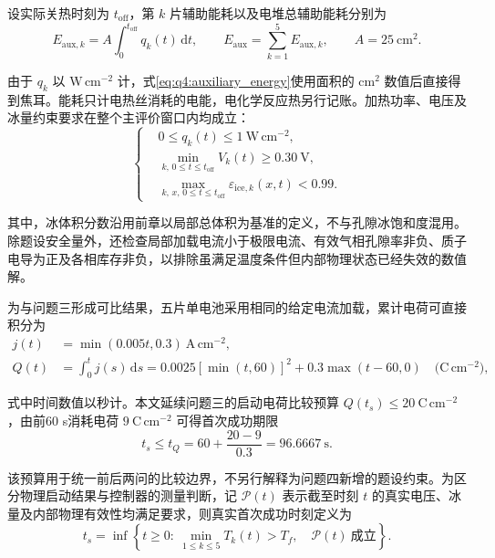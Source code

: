 设实际关热时刻为 $t_{\mathrm{off}}$，第 $k$ 片辅助能耗以及电堆总辅助能耗分别为
\begin{equation}
E_{\mathrm{aux},k}=A\int_0^{t_{\mathrm{off}}}q_k(t)\,\mathrm dt,
\qquad E_{\mathrm{aux}}=\sum_{k=1}^{5}E_{\mathrm{aux},k},
\qquad A=25\ \mathrm{cm^2}.
\tag{7-27}\label{eq:q4:auxiliary_energy}
\end{equation}

由于 $q_k$ 以 $\mathrm{W\,cm^{-2}}$ 计，式\eqref{eq:q4:auxiliary_energy}使用面积的 $\mathrm{cm^2}$ 数值后直接得到焦耳。能耗只计电热丝消耗的电能，电化学反应热另行记账。加热功率、电压及冰量约束要求在整个主评价窗口内均成立：
\begin{equation}
\left\{\begin{aligned}
&0\leq q_k(t)\leq1\ \mathrm{W\,cm^{-2}},\\
&\min_{k,\,0\leq t\leq t_{\mathrm{off}}}V_k(t)\geq0.30\ \mathrm V,\\
&\max_{k,\,x,\,0\leq t\leq t_{\mathrm{off}}}\varepsilon_{\mathrm{ice},k}(x,t)<0.99.
\end{aligned}\right.
\tag{7-28}\label{eq:q4:path_constraints}
\end{equation}

其中，冰体积分数沿用前章以局部总体积为基准的定义，不与孔隙冰饱和度混用。除题设安全量外，还检查局部加载电流小于极限电流、有效气相孔隙率非负、质子电导为正及各相库存非负，以排除虽满足温度条件但内部物理状态已经失效的数值解。

为与问题三形成可比结果，五片单电池采用相同的给定电流加载，累计电荷可直接积分为
\begin{equation}
\begin{aligned}
j(t)&=\min(0.005t,0.3)\ \mathrm{A\,cm^{-2}},\\
Q(t)&=\int_0^tj(s)\,\mathrm ds
=0.0025[\min(t,60)]^2+0.3\max(t-60,0)
\quad\big(\mathrm{C\,cm^{-2}}\big),
\end{aligned}
\tag{7-29}\label{eq:q4:load_charge}
\end{equation}

式中时间数值以秒计。本文延续问题三的启动电荷比较预算 $Q(t_s)\leq20\ \mathrm{C\,cm^{-2}}$，由前60 s消耗电荷 $9\ \mathrm{C\,cm^{-2}}$ 可得首次成功期限
\begin{equation}
t_s\leq t_Q=60+\frac{20-9}{0.3}=96.6667\ \mathrm s.
\tag{7-30}\label{eq:q4:startup_deadline}
\end{equation}

该预算用于统一前后两问的比较边界，不另行解释为问题四新增的题设约束。为区分物理启动结果与控制器的测量判断，记 $\mathcal P(t)$ 表示截至时刻 $t$ 的真实电压、冰量及内部物理有效性均满足要求，则真实首次成功时刻定义为
\begin{equation}
t_s=\inf\left\{t\geq0:\ \min_{1\leq k\leq5}T_k(t)>T_f,
\quad\mathcal P(t)\ \text{成立}\right\}.
\tag{7-31}\label{eq:q4:true_first_success}
\end{equation}

